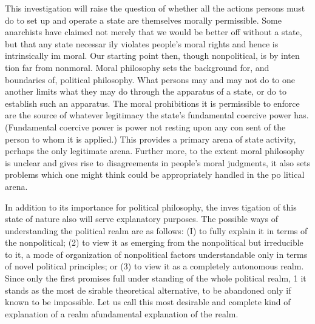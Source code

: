 \documentclass[11pt,openany]{book}
\begin{document}
This investigation will raise the question of whether all the actions persons must do to set up and operate a state are themselves morally permissible. Some anarchists have claimed not merely that we would be better off without a state, but that any state necessar ily violates people's moral rights and hence is intrinsically im moral. Our starting point then, though nonpolitical, is by inten tion far from nonmoral. Moral philosophy sets the background for, and boundaries of, political philosophy. What persons may and may not do to one another limits what they may do through the apparatus of a state, or do to establish such an apparatus. The moral prohibitions it is permissible to enforce are the source of whatever legitimacy the state's fundamental coercive power has. (Fundamental coercive power is power not resting upon any con sent of the person to whom it is applied.) This provides a primary arena of state activity, perhaps the only legitimate arena. Further more, to the extent moral philosophy is unclear and gives rise to disagreements in people's moral judgments, it also sets problems which one might think could be appropriately handled in the po litical arena. 

In addition to its importance for political philosophy, the inves tigation of this state of nature also will serve explanatory purposes. The possible ways of understanding the political realm are as follows: (I) to fully explain it in terms of the nonpolitical; (2) to view it as emerging from the nonpolitical but irreducible to it, a mode of organization of nonpolitical factors understandable only in terms of novel political principles; or (3) to view it as a completely autonomous realm. Since only the first promises full under standing of the whole political realm, 1 it stands as the most de sirable theoretical alternative, to be abandoned only if known to be impossible. Let us call this most desirable and complete kind of explanation of a realm afundamental explanation of the realm. 
\end{document}
